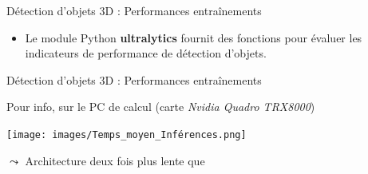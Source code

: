 \documentclass[11pt,serif,mathserif,compress,hyperref={colorlinks}]{beamer}
\begin{document}
\begin{frame}{Détection d'objets 3D : Performances entraînements}

  \begin{itemize}
  \item Le module Python \textbf{ultralytics} fournit des fonctions pour évaluer les
    indicateurs de performance de détection d'objets.\smallskip
    
    
    
  \end{itemize}
    
\end{frame}

\begin{frame}{Détection d'objets 3D : Performances entraînements}
  
  \begin{tcolorbox}[title={Temps moyen d'inférence}]

    Pour info, sur le PC de calcul (carte {\em Nvidia Quadro TRX8000})
    
    \center\texttt{[image: images/Temps\_moyen\_Inférences.png]}

    $\leadsto$ Architecture  deux fois plus lente que 
  \end{tcolorbox}
    
\end{frame}
\end{document}
